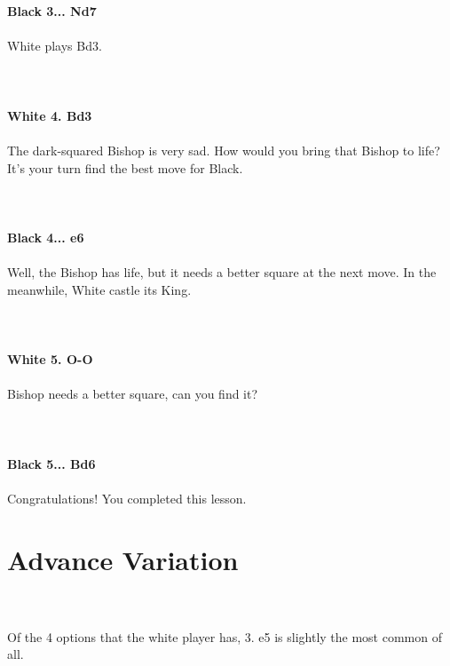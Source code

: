 \documentclass{article}
\begin{document}
\\
\\
\textbf{Black 3... Nd7}\\
\\
White plays Bd3.\\
\\

\\
\\
\textbf{White 4. Bd3}\\
\\
The dark-squared Bishop is very sad. How would you bring that Bishop to life? It's your turn find the best move for Black.\\
\\

\\
\\
\textbf{Black 4... e6}\\
\\
Well, the Bishop has life, but it needs a better square at the next move. In the meanwhile, White castle its King.\\
\\

\\
\\
\textbf{White 5. O-O}\\
\\
Bishop needs a better square, can you find it?\\
\\

\\
\\
\textbf{Black 5... Bd6}\\
\\
Congratulations! You completed this lesson.\section{ Advance Variation}

\\
\\
Of the 4 options that the white player has, 3. e5 is slightly the most common of all.\\
\\

\\
\\
\end{document}
